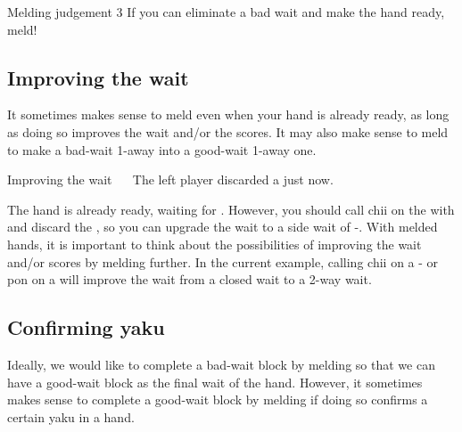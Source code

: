\begin{itembox}[c]{Melding judgement 3}
If you can eliminate a bad wait and make the hand ready, meld!
\end{itembox}

\subsection{Improving the wait}
It sometimes makes sense to meld even when your hand is already ready, as long as doing so improves the wait and/or the scores. It may also make sense to meld to make a bad-wait 1-away into a good-wait 1-away one. 

\bigskip
\begin{itembox}[r]{Improving the wait}
\bp
{}\rfw{}\rfd{}~~\zhong\zhong\rzhong
\ep
\vspace{-10pt}The left player discarded a {\large{}} just now.
\end{itembox}
\noindent
The hand is already ready, waiting for {\large{}}. However, you should call {\jap chii} on the {\large{}} with {\large{}} and discard the {\large{}}, so you can upgrade the wait to a side wait of {\large{}-}. 
With melded hands, it is important to think about the possibilities of improving the wait and/or scores by melding further. 
In the current example, calling {\jap chii} on a {\large{}-} or {\jap pon} on a {\large{}} will improve the wait from a closed wait to a 2-way wait. 

\bigskip
\subsection{Confirming {\jap yaku}}
Ideally, we would like to complete a bad-wait block by melding so that we can have a good-wait block as the final wait of the hand. However, it sometimes makes sense to complete a good-wait block by melding if doing so confirms a certain {\jap yaku} in a hand. 

